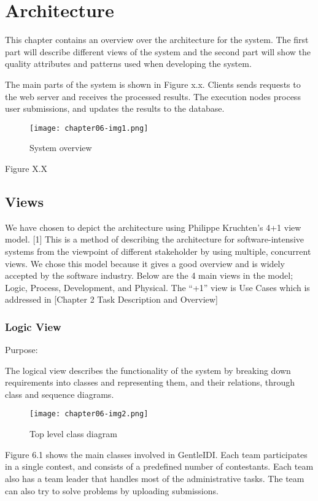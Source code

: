 
\chapter{Architecture}

This chapter contains an overview over the architecture for the system.
The first part will describe different views of the system and the
second part will show the quality attributes and patterns used when
developing the system.


\bigskip

The main parts of the system is shown in Figure x.x. Clients sends
requests to the web server and receives the processed results. The
execution nodes process user submissions, and updates the results to
the database. 
\begin{figure}[t]
 	\texttt{[image: chapter06-img1.png]} 
 	\caption{System overview}
\end{figure}
Figure X.X

\section{Views}

We have chosen to depict the architecture using Philippe
Kruchten{\textquoteright}s 4+1 view model. [1] This is a method of
describing the architecture for software-intensive systems from the
viewpoint of different stakeholder by using multiple, concurrent views.
We chose this model because it gives a good overview and is widely
accepted by the software industry. Below are the 4 main views in the
model; Logic, Process, Development, and Physical. The
{\textquotedblleft}+1{\textquotedblright} view is Use Cases which is
addressed in [Chapter 2 Task Description and Overview]

\subsection{Logic View}

Purpose: 

The logical view describes the functionality of the system by breaking
down requirements into classes and representing them, and their
relations, through class and sequence diagrams.
\begin{figure}[h!]
	\texttt{[image: chapter06-img2.png]} 
	\caption{Top level class diagram}
\end{figure}


Figure 6.1 shows the main classes involved in GentleIDI. Each team
participates in a single contest, and consists of a predefined number
of contestants. Each team also has a team leader that handles most of
the administrative tasks. The team can also try to solve problems by
uploading submissions. 



